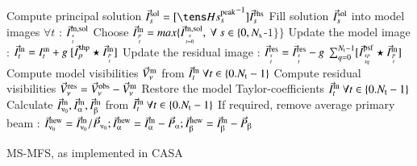 \documentclass[11pt,a4paper]{article}
\begin{document}
\begin{algorithm}
{{{{          Compute principal solution $\I^{\rm sol}_s = [{\He^{\rm peak}_s}^{-1}] \I^{\rm rhs}_s$\;
          Fill solution ${\vec{I}}^{\rm sol}_s$ into model images $\forall t$ : ${\vec{I}}^{\rm m,sol}_{{s}\atop{t}}$
       }
    }
       Choose ${\vec{I}}^{\rm m}_{{p}\atop{t}} = max\{{\vec{I}}^{\rm m,sol}_{{s}\atop{t=0}},~\forall~s\in\{0,N_{\rm s} $-$1\}\}$ \;
       {
        Update the model image : ${\vec{I}}^{\rm m}_t = I^{\rm m}_t + g ~[ {\vec{I}}^{\rm shp}_{p} \star {\vec{I}}^{\rm m}_{{p}\atop{t}}]$ \;
	{
          Update the residual image : ${\vec{I}}^{\rm res}_{{s}\atop{t}} = {\vec{I}}^{\rm res}_{{s}\atop{t}} - g ~\sum_{q=0}^{N_{\rm t} -1}[{\vec{I}}^{\rm psf}_{{sp}\atop{tq}} \star {\vec{I}}^{\rm m}_{{p}\atop{t}}]$\;
	}
       }
    }
   Compute model visibilities $\vec{V}^{\rm m}_{\nu}$ from  ${\vec{I}}^{\rm m}_t~\forall t\in \{0.N_{\rm t} -1\}$\;
   Compute residual visibilities $\vec{V}^{\rm res}_{\nu} = \vec{V}^{\rm obs}_{\nu}-\vec{V}^{\rm m}_{\nu}$\;
  }
  \vspace{0.5cm} 
Restore the model Taylor-coefficients ${\vec{I}}^{\rm m}_t~\forall t\in \{0.N_{\rm t} -1\}$ \;
Calculate $\vec{I}^{\rm m}_{\nuup_0}, \vec{I}^{\rm m}_{\alphaup}, \vec{I}^{\rm m}_{\betaup}$ from ${\vec{I}}^{\rm m}_t~\forall t\in \{0.N_{\rm t} -1\}$\;
If required, remove average primary beam : $\vec{I}^{\rm new}_{\nuup_0}=\vec{I}^{\rm m}_{\nuup_0}/\vec{P}_{\nuup_0};  \vec{I}^{\rm new}_{\alphaup}=\vec{I}^{\rm m}_{\alphaup}-\vec{P}_{\alphaup};  \vec{I}^{\rm new}_{\betaup}=\vec{I}^{\rm m}_{\betaup}-\vec{P}_{\betaup}$\;

  \caption[MS-MFS Algorithm]
         {MS-MFS, as implemented in CASA}\label{CASA}

\end{algorithm}
\end{document}
